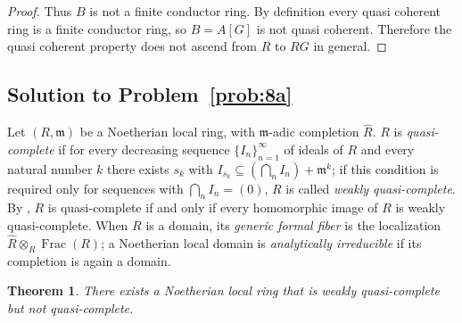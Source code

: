 \documentclass[11pt,reqno]{amsart}
\numberwithin{equation}{section}
\newtheorem{theorem}[thm]{Theorem}
\theoremstyle{definition}
\begin{document}
\begin{proof}
Thus $B$ is not a finite conductor ring. By definition every quasi
coherent ring is a finite conductor ring, so $B=A[G]$ is not quasi
coherent. Therefore the quasi coherent property does not ascend from
$R$ to $RG$ in general.
\end{proof}

\subsection{Solution to Problem~\ref{prob:8a}}\label{subsec:proof-8a}

Let $(R,\mathfrak m)$ be a Noetherian local ring, with $\mathfrak m$-adic
completion $\widehat R$. $R$ is \emph{quasi-complete} if for every
decreasing sequence $\{I_n\}_{n=1}^\infty$ of ideals of $R$ and every
natural number $k$ there exists $s_k$ with
$I_{s_k}\subseteq(\bigcap_n I_n)+\mathfrak m^k$; if this condition is
required only for sequences with $\bigcap_n I_n=(0)$, $R$ is called
\emph{weakly quasi-complete}. By \cite{Anderson2014-QCRM}, $R$ is
quasi-complete if and only if every homomorphic image of $R$ is weakly
quasi-complete. When $R$ is a domain, its \emph{generic formal fiber}
is the localization $\widehat R\otimes_R\operatorname{Frac}(R)$; a
Noetherian local domain is \emph{analytically irreducible} if its
completion is again a domain.

\begin{theorem}\label{thm:8a}
There exists a Noetherian local ring that is weakly quasi-complete but
not quasi-complete.
\end{theorem}
\end{document}
